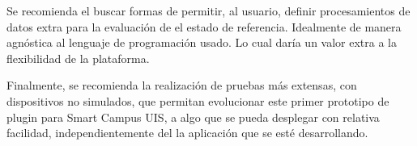 Se recomienda el buscar formas de permitir, al usuario, definir procesamientos de datos extra para la evaluación de el estado de referencia. Idealmente de manera agnóstica al lenguaje de programación usado. Lo cual daría un valor extra a la flexibilidad de la plataforma.

Finalmente, se recomienda la realización de pruebas más extensas, con dispositivos no simulados, que permitan evolucionar este primer prototipo de plugin para Smart Campus UIS, a algo que se pueda desplegar con relativa facilidad, independientemente del la aplicación que se esté desarrollando.

